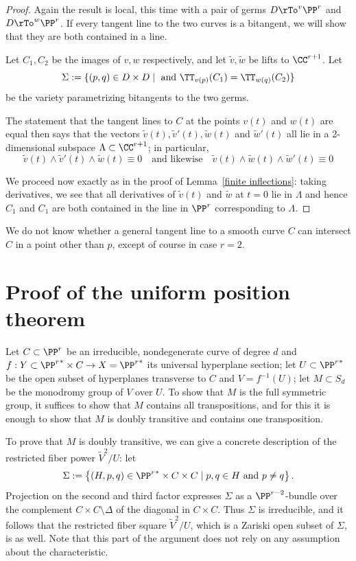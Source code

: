  \begin{proof} Again the result is local, this time with a pair of germs $D\rTo^v \PP^r$ and $D\rTo^w \PP^r$. If every
 tangent line to the two curves is a bitangent, we will show that they are both contained in a line.
 
  Let $C_1, C_2$ be the images of $v,w$ respectively, and let $\tilde v, \tilde w$ be lifts to $\CC^{r+1}$.
 Let  
 $$
 \Sigma := \{ (p,q) \in D \times D \mid \text{ and }\TT_{v(p)}(C_1) = \TT_{w(q)}(C_2) \}
 $$
 be the variety parametrizing bitangents to the two germs. 
 
 
 
 The statement that the tangent lines to $C$ at the points $v(t)$ and $w(t)$ are equal then says that the vectors $\tilde v(t), \tilde v'(t),\tilde w(t)$ and $\tilde w'(t)$ all lie in a 2-dimensional subspace $\Lambda \subset \CC^{r+1}$; in particular,
 $$
 \tilde v(t) \wedge \tilde v'(t) \wedge \tilde w(t) \equiv 0 \quad \text{and likewise} \quad \tilde v(t) \wedge \tilde w(t) \wedge \tilde w'(t) \equiv 0
 $$
 
We proceed now exactly as in the proof of Lemma~\ref{finite inflections}: taking derivatives, we see that all derivatives of $\tilde v(t)$
and $\tilde w$ at $t=0$ lie in $\Lambda$
and hence $C_1$ and $C_1$ are both contained in the line in $\PP^r$ corresponding to $\Lambda$.
 \end{proof}

We do not know whether  a general tangent line to a smooth curve $C$ can intersect $C$ in a point other than $p$, except of course in case $r=2$. %

\section{Proof of the uniform position theorem}

Let $C \subset \PP^r$ be an irreducible, nondegenerate curve of degree $d$ and $f : Y \subset {\PP^r}^* \times C \to  X = {\PP^r}^*$ its universal hyperplane section; let $U \subset {\PP^r}^*$ be the open subset of hyperplanes transverse to $C$ and $V = f^{-1}(U)$; let $M \subset S_d$ be the monodromy group of $V$ over $U$.
To show that  $M$ is the full symmetric group, it suffices to show that $M$ contains all transpositions, and for this it is enough to show that $M$ is doubly transitive and contains one transposition.

To prove that $M$ is doubly transitive, we can give a concrete description of the restricted fiber power $\tilde V^2/U$: let
$$
\Sigma := \left\{ (H, p, q) \in {\PP^r}^* \times C \times C \mid p, q \in H \text{ and } p \neq q \right\}.
$$
Projection on the second and third factor expresses $\Sigma$ as a $\PP^{r-2}$-bundle over the complement $C \times C \setminus \Delta$ of the diagonal in $C \times C$. Thus $\Sigma$ is irreducible, and it follows that the restricted fiber square $\tilde V^2/U$, which is a Zariski open subset of $\Sigma$, is as well. Note that this part of the argument does not rely on any assumption about the characteristic.

